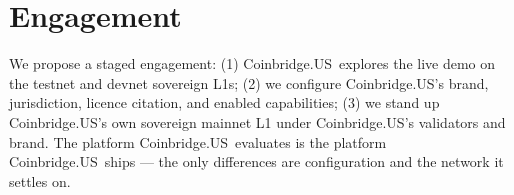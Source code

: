 \documentclass[11pt,a4paper]{article}
\newcommand{\customer}{Coinbridge.US}
\begin{document}
\section{Engagement}

We propose a staged engagement: (1) \customer\ explores the live demo on
the testnet and devnet sovereign L1s; (2) we configure \customer's brand,
jurisdiction, licence citation, and enabled capabilities; (3) we stand up
\customer's own sovereign mainnet L1 under \customer's validators and
brand. The platform \customer\ evaluates is the platform \customer\ ships
--- the only differences are configuration and the network it settles on.
\end{document}

